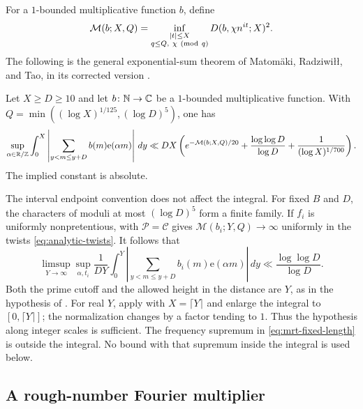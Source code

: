 For a $1$-bounded multiplicative function $b$, define
\[
 \mathcal M(b;X,Q)=
 \inf_{\substack{|t|\le X\\q\le Q,\ \chi\ ({\rm mod}\ q)}}
     D(b,\chi n^{it};X)^2.
\]
The following is the general exponential-sum theorem of
Matom\"aki, Radziwi\l\l, and Tao, in its corrected version
\cite[Theorem~1.7]{MRT15}.

\begin{theorem}\label{thm:mrt}
Let $X\ge D\ge10$ and let $b\colon\mathbb N\to\mathbb C$ be a $1$-bounded
multiplicative function. With
$Q=\min((\log X)^{1/125},(\log D)^5)$, one has
\begin{equation}\label{eq:mrt-input}
 \begin{split}
 \sup_{\alpha\in\mathbb R/\mathbb Z}\int_0^X
 \left|\sum_{y<m\le y+D}b(m)\mathrm e(\alpha m)\right|\,dy
 \ll DX\left(
 e^{-\mathcal M(b;X,Q)/20}
 +\frac{\log\log D}{\log D}
 +\frac1{(\log X)^{1/700}}\right).
 \end{split}
\end{equation}
The implied constant is absolute.
\end{theorem}

The interval endpoint convention does not affect the integral.
For fixed $B$ and $D$, the characters of moduli at most $(\log D)^5$
form a finite family. If $f_i$ is uniformly nonpretentious,
 with $\mathcal P=\mathcal C$ gives
$\mathcal M(b_i;Y,Q)\to\infty$ uniformly in the twists
\eqref{eq:analytic-twists}. It follows that
\begin{equation}\label{eq:mrt-fixed-length}
 \limsup_{Y\to\infty}\sup_{\alpha,t_i}
 \frac1{DY}\int_0^Y
 \left|\sum_{y<m\le y+D}b_i(m)\mathrm e(\alpha m)\right|\,dy
 \ll\frac{\log\log D}{\log D}.
\end{equation}
Both the prime cutoff and the allowed height in the distance are $Y$,
as in the hypothesis of . For real $Y$, apply
 with $X=\lceil Y\rceil$ and enlarge the integral to
$[0,\lceil Y\rceil]$; the normalization changes by a factor tending
to $1$. Thus the hypothesis along integer scales is sufficient.
The frequency supremum in
\eqref{eq:mrt-fixed-length} is outside the integral. No bound with that
supremum inside the integral is used below.

\subsection{A rough-number Fourier multiplier}

